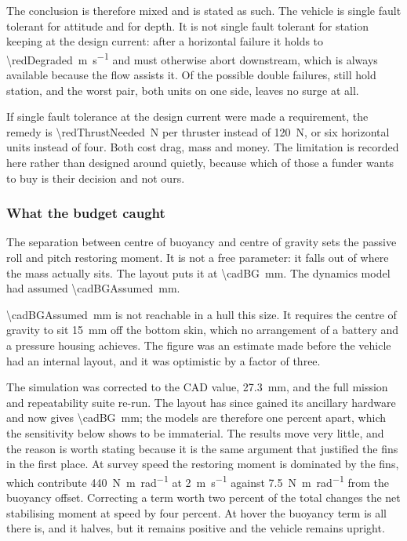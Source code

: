 \documentclass[10pt,a4paper]{article}
\begin{document}
The conclusion is therefore mixed and is stated as such. The vehicle is single
fault tolerant for attitude and for depth. It is not single fault tolerant for
station keeping at the design current: after a horizontal failure it holds to
\SI{\redDegraded}{\metre\per\second} and must otherwise abort downstream, which
is always available because the flow assists it. Of the
\redPairsTotal{} possible double failures, \redPairsOk{} still hold station,
and the worst pair, both units on one side, leaves no surge at all.

If single fault tolerance at the design current were made a requirement, the
remedy is \SI{\redThrustNeeded}{\newton} per thruster instead of
\SI{120}{\newton}, or six horizontal units instead of four. Both cost drag,
mass and money. The limitation is recorded here rather than designed around
quietly, because which of those a funder wants to buy is their decision and not
ours.

\subsubsection{What the budget caught}\label{sec:cad-budget}

The separation between centre of buoyancy and centre of gravity sets the
passive roll and pitch restoring moment. It is not a free parameter: it falls
out of where the mass actually sits. The layout puts it at
\SI{\cadBG}{\milli\metre}. The dynamics model had assumed
\SI{\cadBGAssumed}{\milli\metre}.

\SI{\cadBGAssumed}{\milli\metre} is not reachable in a hull this size. It
requires the centre of gravity to sit \SI{15}{\milli\metre} off the bottom
skin, which no arrangement of a battery and a pressure housing achieves. The
figure was an estimate made before the vehicle had an internal layout, and it
was optimistic by a factor of three.

The simulation was corrected to the CAD value, \SI{27.3}{\milli\metre}, and
the full mission and repeatability suite re-run. The layout has since gained
its ancillary hardware and now gives \SI{\cadBG}{\milli\metre}; the models are
therefore one percent apart, which the sensitivity below shows to be
immaterial. The results move very little, and the reason is
worth stating because it is the same argument that justified the fins in the
first place. At survey speed the restoring moment is dominated by the fins,
which contribute \SI{440}{\newton\metre\per\radian} at \SI{2}{\metre\per\second}
against \SI{7.5}{\newton\metre\per\radian} from the buoyancy offset. Correcting
a term worth two percent of the total changes the net stabilising moment at
speed by four percent. At hover the buoyancy term is all there is, and it
halves, but it remains positive and the vehicle remains upright.
\end{document}
